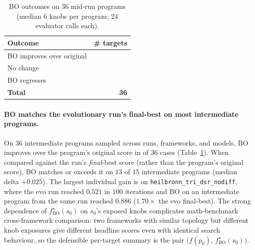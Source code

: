 \begin{table}
\vspace{-1.0em}
\centering
\caption{BO outcomes on $36$ mid-run programs (median $6$ knobs per program; $24$ evaluator calls each).}
\label{tab:bo-outcome}
\small
\setlength{\tabcolsep}{8pt}
\renewcommand{\arraystretch}{1.15}
\begin{tabular}{@{}lr@{}}
\toprule
\textbf{Outcome} & \textbf{\# targets} \\
\midrule
BO improves over original & \NBOwins{} \\
No change                 & \NBOnochange{} \\
BO regresses              & \NBOregress{} \\
\midrule
\textbf{Total}            & \textbf{36} \\
\bottomrule
\end{tabular}
\vspace{-0.6em}
\end{table}

\paragraph{BO matches the evolutionary run's final-best on most intermediate programs.}
On $36$ intermediate programs sampled across runs, frameworks, and models, BO improves over the program's original score in \NBOwins{} of $36$ cases (Table~\ref{tab:bo-outcome}). When compared against the run's \emph{final}-best score (rather than the program's original score), BO matches or exceeds it on $13$ of $15$ intermediate programs (median delta $+0.025$). The largest individual gain is on \texttt{heilbronn\_tri\_dsr\_nodiff}, where the evo run reached $0.521$ in $100$ iterations and BO on an intermediate program from the same run reached $0.886$ ($1.70\times$ the evo final-best). The strong dependence of $f^{\star}_{\mathrm{BO}}(s_0)$ on $s_0$'s exposed knobs complicates math-benchmark cross-framework comparison: two frameworks with similar topology but different knob exposures give different headline scores even with identical search behaviour, so the defensible per-target summary is the pair $\big(f(p_0),\, f^{\star}_{\mathrm{BO}}(s_0)\big)$.


